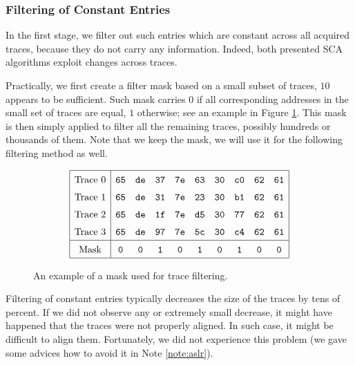 \subsubsection{Filtering of Constant Entries}
	
	In the first stage, we filter out such entries which are constant across all acquired traces, because they do not carry any information. Indeed, both presented SCA algorithms exploit changes across traces.
	
	Practically, we first create a filter mask based on a small subset of traces, $10$ appears to be sufficient. Such mask carries $0$ if all corresponding addresses in the small set of traces are equal, $1$ otherwise; see an example in Figure \ref{fig:constmask}. This mask is then simply applied to filter all the remaining traces, possibly hundreds or thousands of them. Note that we keep the mask, we will use it for the following filtering method as well.
	
	\begin{figure}[H]
	\[
	\arraycolsep=.5em\def\arraystretch{1.5}
		\begin{array}{|c|ccccccccc|}
			\hline
			\textnormal{Trace 0} & {\tt 65} & {\tt de} & {\tt 37} & {\tt 7e} & {\tt 63} & {\tt 30} & {\tt c0} & {\tt 62} & {\tt 61} \\
			\textnormal{Trace 1} & {\tt 65} & {\tt de} & {\tt 31} & {\tt 7e} & {\tt 23} & {\tt 30} & {\tt b1} & {\tt 62} & {\tt 61} \\
			\textnormal{Trace 2} & {\tt 65} & {\tt de} & {\tt 1f} & {\tt 7e} & {\tt d5} & {\tt 30} & {\tt 77} & {\tt 62} & {\tt 61} \\
			\textnormal{Trace 3} & {\tt 65} & {\tt de} & {\tt 97} & {\tt 7e} & {\tt 5c} & {\tt 30} & {\tt c4} & {\tt 62} & {\tt 61} \\
			\hline
			\textnormal{Mask}    & {\tt 0}  & {\tt 0}  & {\tt 1}  & {\tt 0}  & {\tt 1}  & {\tt 0}  & {\tt 1}  & {\tt 0}  & {\tt 0} \\
			\hline
		\end{array}
	\]
	\caption{An example of a mask used for trace filtering.}
	\label{fig:constmask}
	\end{figure}
	
	\begin{note}
	\label{note:filter}
		Filtering of constant entries typically decreases the size of the traces by tens of percent. If we did not observe any or extremely small decrease, it might have happened that the traces were not properly aligned. In such case, it might be difficult to align them. Fortunately, we did not experience this problem (we gave some advices how to avoid it in Note \ref{note:aslr}).
	\end{note}

